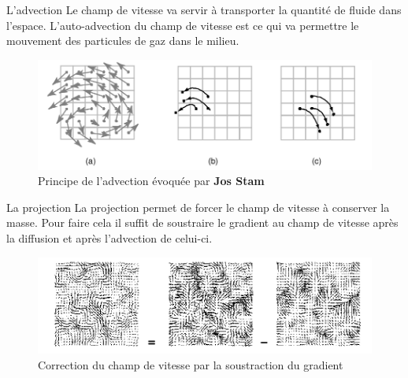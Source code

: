 \documentclass{beamer}
\begin{document}
\begin{frame}{L'advection}
  Le champ de vitesse va servir à transporter la quantité de fluide
  dans l’espace. L’auto-advection du champ de vitesse est ce qui va
  permettre le mouvement des particules de gaz dans le milieu.
  \begin{figure}[h]
    \centering\includegraphics[scale=0.3]{STAM2.png}
    \caption{Principe de l'advection évoquée par \textbf{Jos Stam}}
    \label{AdvectionStam}
  \end{figure}
\end{frame}

\begin{frame}{La projection}
  La projection permet de forcer le champ de vitesse à conserver la
  masse. Pour faire cela il suffit de soustraire le gradient au champ
  de vitesse après la diffusion et après l'advection de celui-ci.
  \begin{figure}[h]
    \centering\includegraphics[scale=0.3]{STAM3.png}
    \caption{Correction du champ de vitesse par la soustraction du gradient}
    \label{ProjectionStam}
  \end{figure}
\end{frame}
\end{document}
